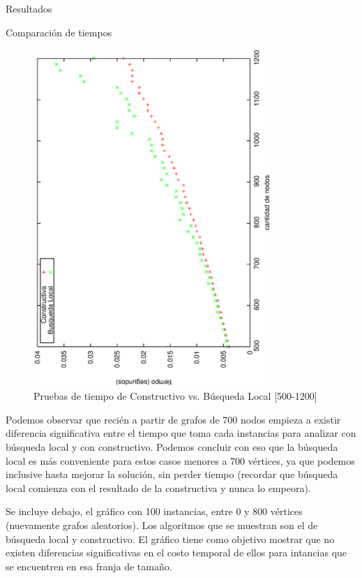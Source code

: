 \documentclass[12pt,titlepage]{article}
\begin{document}
\begin{section}{Resultados}
\begin{subsection}{Comparación de tiempos}
		\begin{figure}[H]
			\centering
					\includegraphics[width=9cm,angle=-90]{conclusiones/heuris_rapidas2.eps}
			\caption{Pruebas de tiempo de Constructivo vs. Búsqueda Local [500-1200]}
			\label{fig:Tiempo de const_bus_loc}
		\end{figure}
		
		Podemos observar que recién a partir de grafos de 700 nodos empieza a existir diferencia significativa entre el tiempo que toma cada instancias para analizar con búsqueda local y con constructivo. Podemos concluir con eso que la búsqueda local es más conveniente para estos casos menores a 700 vértices, ya que podemos inclusive hasta mejorar la solución, sin perder tiempo (recordar que búsqueda local comienza con el resultado de la constructiva y nunca lo empeora).
		
		Se incluye debajo, el gráfico con 100 instancias, entre 0 y 800 vértices (nuevamente grafos aleatorios). Los algoritmos que se muestran son el de búsqueda local y constructivo. El gráfico tiene como objetivo mostrar que no existen diferencias significativas en el costo temporal de ellos para intancias que se encuentren en esa franja de tamaño.
		

\end{subsection}
\end{section}
\end{document}
